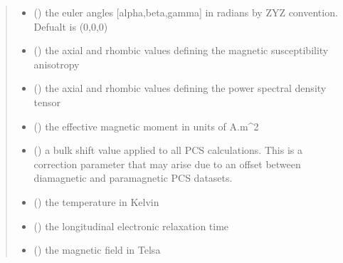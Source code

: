 \documentclass[a4paper,10pt,english,openany,oneside]{sphinxmanual}
\begin{document}
\begin{fulllineitems}
\begin{fulllineitems}
\begin{quote}
\begin{description}
\begin{itemize}
\item {} 
\sphinxAtStartPar
{} (\sphinxstyleliteralemphasis{\sphinxupquote{, }}) \textendash{} the euler angles {[}alpha,beta,gamma{]} in radians
by ZYZ convention. Defualt is (0,0,0)

\item {} 
\sphinxAtStartPar
{} (\sphinxstyleliteralemphasis{\sphinxupquote{, }}) \textendash{} the axial and rhombic values defining the magnetic susceptibility
anisotropy

\item {} 
\sphinxAtStartPar
{} (\sphinxstyleliteralemphasis{\sphinxupquote{, }}) \textendash{} the axial and rhombic values defining the power spectral density
tensor

\item {} 
\sphinxAtStartPar
{} () \textendash{} the effective magnetic moment in units of A.m\textasciicircum{}2

\item {} 
\sphinxAtStartPar
{} () \textendash{} a bulk shift value applied to all PCS calculations.
This is a correction parameter that may arise due to an offset
between diamagnetic and paramagnetic PCS datasets.

\item {} 
\sphinxAtStartPar
{} () \textendash{} the temperature in Kelvin

\item {} 
\sphinxAtStartPar
{} () \textendash{} the longitudinal electronic relaxation time

\item {} 
\sphinxAtStartPar
{} () \textendash{} the magnetic field in Telsa


\end{itemize}
\end{description}
\end{quote}
\end{fulllineitems}
\end{fulllineitems}
\end{document}
